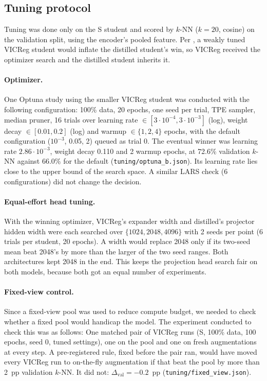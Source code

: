 \documentclass[letterpaper,11pt]{article}
\begin{document}
\subsection{Tuning protocol}
\label{sec:tuning}

Tuning was done only on the S student and scored by $k$-NN ($k=20$, cosine) on the validation split,
using the encoder's pooled feature. Per \citet{shi2022smallssl}, a weakly
tuned VICReg student would inflate the distilled student's win, so VICReg received the optimizer search and the distilled student inherits it.

\paragraph{Optimizer.} One Optuna study using the smaller VICReg student was conducted with the following configuration: 100\% data, 20 epochs, one seed per trial, TPE sampler, median pruner, 16 trials over learning rate $\in[3\cdot10^{-4},3\cdot10^{-3}]$
(log), weight decay $\in[0.01,0.2]$ (log) and warmup $\in\{1,2,4\}$ epochs, with the
default configuration ($10^{-3}$, 0.05, 2) queued as trial 0. The eventual winner was learning rate
$2.86\cdot10^{-3}$, weight decay 0.110 and 2 warmup epochs, at 72.6\% validation $k$-NN
against 66.0\% for the default (\texttt{tuning/optuna\_b.json}). Its learning rate lies close
to the upper bound of the search space.
A similar LARS check (6 configurations) did not change the decision.

\paragraph{Equal-effort head tuning.} With the winning optimizer, VICReg's expander width and distilled's
projector hidden width were each searched over $\{1024, 2048, 4096\}$ with 2 seeds per point
(6 trials per student, 20 epochs). A width would replace 2048 only if its two-seed mean beat
2048's by more than the larger of the two seed ranges. Both architectures kept 2048 in the end. This keeps the projection head search fair on both models, because both got an equal number of experiments. 

\paragraph{Fixed-view control.} Since a fixed-view pool was used to reduce compute budget, we needed to check whether a fixed pool would handicap the model. The experiment conducted to check this was as follows: One matched pair of VICReg runs (S, 100\% data, 100 epochs, seed
0, tuned settings), one on the pool and one on fresh augmentations at every step. A pre-registered rule, fixed before the pair ran,
would have moved every VICReg run to on-the-fly augmentation if that beat the pool by more
than 2~pp validation $k$-NN. It did not: $\Delta_{\text{val}}=-0.2$~pp
(\texttt{tuning/fixed\_view.json}).
\end{document}
